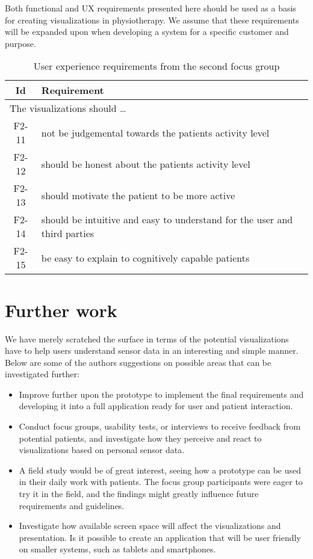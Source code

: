Both functional and UX requirements presented here should be used as a basis for creating visualizations in physiotherapy. We assume that these requirements will be expanded upon when developing a system for a specific customer and purpose.

\begin{table}[h!]
  \begin{center}
  \begin{tabular}{|c|p{12cm}|}
    \hline
      \textbf{Id} & \textbf{Requirement} \\ \hline
    \multicolumn{2}{|l|}{The visualizations should \ldots} \\ \hline
      F2-11 & not be judgemental towards the patients activity level \\ \hline
      F2-12 & should be honest about the patients activity level \\ \hline
      F2-13 & should motivate the patient to be more active \\ \hline
      F2-14 & should be intuitive and easy to understand for the user and third parties \\ \hline
      F2-15 & be easy to explain to cognitively capable patients \\ \hline
  \end{tabular}
  \end{center}
  \caption{User experience requirements from the second focus group}
  \label{tab:f2ReqUxCon}
\end{table}

\section{Further work}
We have merely scratched the surface in terms of the potential visualizations have to help users understand sensor data in an interesting and simple manner. Below are some of the authors suggestions on possible areas that can be investigated further:


\begin{itemize}
  \item Improve further upon the prototype to implement the final requirements and developing it into a full application ready for user and patient interaction.
  \item Conduct focus groups, usability tests, or interviews to receive feedback from potential patients, and investigate how they perceive and react to visualizations based on personal sensor data.
  \item A field study would be of great interest, seeing how a prototype can be used in their daily work with patients. The focus group participants were eager to try it in the field, and the findings might greatly influence future requirements and guidelines.
  \item Investigate how available screen space will affect the visualizations and presentation. Is it possible to create an application that will be user friendly on smaller systems, such as tablets and smartphones.
\end{itemize}


